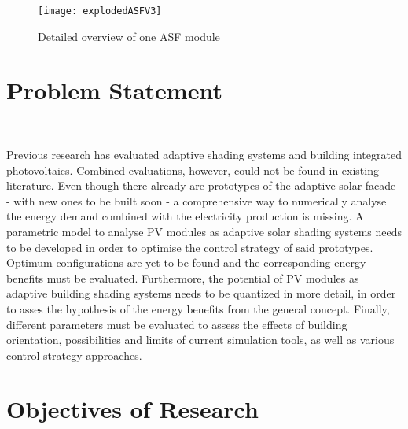 	\begin{figure}[ht] %
		\begin{center}
		\texttt{[image: explodedASFV3]}
		\caption{Detailed overview of one ASF module \cite{nagy2016}}
		\label{fig:exploded}
		\end{center} 
	\end{figure}


	\section{Problem Statement}\

	Previous research has evaluated adaptive shading systems and building integrated photovoltaics. Combined evaluations, however, could not be found in existing literature. Even though there already are prototypes of the adaptive solar facade - with new ones to be built soon - a comprehensive way to numerically analyse the energy demand combined with the electricity production is missing. A parametric model to analyse PV modules as adaptive solar shading systems needs to be developed in order to optimise the control strategy of said prototypes. Optimum configurations are yet to be found and the corresponding energy benefits must be evaluated. Furthermore, the potential of PV modules as adaptive building shading systems needs to be quantized in more detail, in order to asses the hypothesis of the energy benefits from the general concept. Finally, different parameters must be evaluated to assess the effects of building orientation, possibilities and limits of current simulation tools, as well as various control strategy approaches.




\section{Objectives of Research}\

